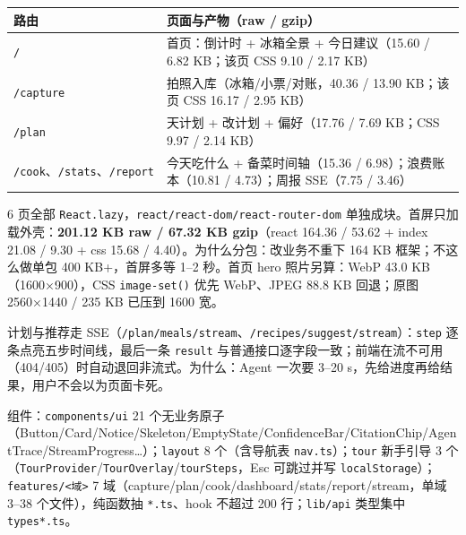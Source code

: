 {\def\LTcaptype{none} %
\begin{longtable}[]{@{}
  >{\raggedright\arraybackslash}p{}
  >{\raggedright\arraybackslash}p{}@{}}
\toprule\noalign{}
\begin{minipage}[b]{\linewidth}\raggedright
路由
\end{minipage} & \begin{minipage}[b]{\linewidth}\raggedright
页面与产物（raw / gzip）
\end{minipage} \\
\midrule\noalign{}
\endhead
\bottomrule\noalign{}
\endlastfoot
\passthrough{\lstinline!/!} & 首页：倒计时 + 冰箱全景 + 今日建议（15.60
/ 6.82 KB；该页 CSS 9.10 / 2.17 KB） \\
\passthrough{\lstinline!/capture!} & 拍照入库（冰箱/小票/对账，40.36 /
13.90 KB；该页 CSS 16.17 / 2.95 KB） \\
\passthrough{\lstinline!/plan!} & 3 天计划 + 改计划 + 偏好（17.76 / 7.69
KB；CSS 9.97 / 2.14 KB） \\
\passthrough{\lstinline!/cook!}、\passthrough{\lstinline!/stats!}、\passthrough{\lstinline!/report!}
& 今天吃什么 + 备菜时间轴（15.36 / 6.98）；浪费账本（10.81 /
4.73）；周报 SSE（7.75 / 3.46） \\
\end{longtable}
}

6 页全部
\passthrough{\lstinline!React.lazy!}，\passthrough{\lstinline!react/react-dom/react-router-dom!}
单独成块。首屏只加载外壳：\textbf{201.12 KB raw / 67.32 KB gzip}（react
164.36 / 53.62 + index 21.08 / 9.30 + css 15.68 /
4.40）。为什么分包：改业务不重下 164 KB 框架；不这么做单包 400
KB+，首屏多等 1--2 秒。首页 hero 照片另算：WebP 43.0 KB（1600×900），CSS
\passthrough{\lstinline!image-set()!} 优先 WebP、JPEG 88.8 KB 回退；原图
2560×1440 / 235 KB 已压到 1600 宽。

计划与推荐走
SSE（\passthrough{\lstinline!/plan/meals/stream!}、\passthrough{\lstinline!/recipes/suggest/stream!}）：\passthrough{\lstinline!step!}
逐条点亮五步时间线，最后一条 \passthrough{\lstinline!result!}
与普通接口逐字段一致；前端在流不可用（404/405）时自动退回非流式。为什么：Agent
一次要 3--20 s，先给进度再给结果，用户不会以为页面卡死。

组件：\passthrough{\lstinline!components/ui!} 21
个无业务原子（Button/Card/Notice/Skeleton/EmptyState/ConfidenceBar/CitationChip/AgentTrace/StreamProgress\ldots）；\passthrough{\lstinline!layout!}
8 个（含导航表
\passthrough{\lstinline!nav.ts!}）；\passthrough{\lstinline!tour!}
新手引导 3
个（\passthrough{\lstinline!TourProvider!}/\passthrough{\lstinline!TourOverlay!}/\passthrough{\lstinline!tourSteps!}，Esc
可跳过并写
\passthrough{\lstinline!localStorage!}）；\passthrough{\lstinline!features/<域>!}
7 域（capture/plan/cook/dashboard/stats/report/stream，单域 3--38
个文件），纯函数抽 \passthrough{\lstinline!*.ts!}、hook 不超过 200
行；\passthrough{\lstinline!lib/api!} 类型集中
\passthrough{\lstinline!types*.ts!}。


